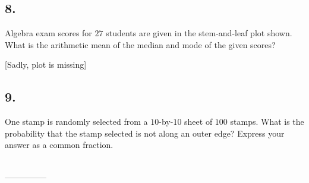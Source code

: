 \documentclass[12pt]{article}
\begin{document}
\subsection*{8.}
Algebra exam scores for $27$ students are given in the stem-and-leaf plot shown. What is the arithmetic mean of the median and mode of the given scores?

[Sadly, plot is missing]

\nopagebreak

\fbox{\phantom{ANSWER}}

\begin{answer}
%
\end{answer}


\subsection*{9.}
One stamp is randomly selected from a $10$-by-$10$ sheet of $100$ stamps. What is the probability that the stamp selected is not along an outer edge? Express your answer as a common fraction. 

\nopagebreak

\begin{minipage}[b]{\linewidth}
\fbox{\phantom{ANSWER}}\\
\mbox{---------------}\\
\fbox{\phantom{ANSWER}}
\end{minipage}
\end{document}
